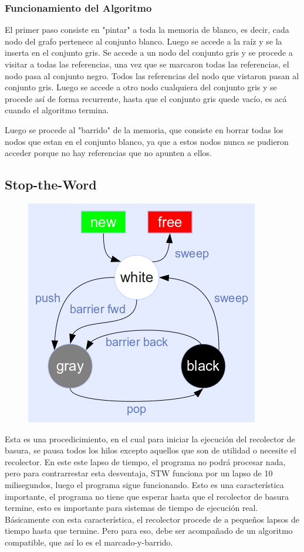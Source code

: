 \documentclass{article}
\begin{document}
\subsubsection{Funcionamiento del Algoritmo}

El primer paso consiste en "pintar" a toda la memoria de blanco, es decir, cada nodo del grafo pertenece al conjunto blanco. Luego se accede a la raíz y se la inserta en el conjunto gris. 
Se accede a un nodo del conjunto gris y se procede a visitar a todas las referencias, una vez que se marcaron todas las referencias, el nodo pasa al conjunto negro. Todos las referencias del nodo que vistaron pasan al conjunto gris. Luego se accede a otro nodo cualquiera del conjunto gris y se procede así de forma recurrente, hasta que el conjunto gris quede vacío, es acá cuando el algoritmo termina.

Luego se procede al "barrido" de la memoria, que consiste en borrar todas los nodos que estan en el conjunto blanco, ya que a estos nodos nunca se pudieron acceder porque no hay referencias que no apunten a ellos.


\subsection{Stop-the-Word}

\begin{figure}
\centering
\includegraphics[width=0.4\linewidth]{./gc_color3}
\label{fig:gc_color3}
\end{figure}


Esta es una procedicimiento, en el cual para iniciar la ejecución del recolector de basura, se pausa todos los hilos excepto aquellos que son de utilidad o necesite el recolector. En este este lapso de tiempo, el programa no podrá procesar nada, pero para contrarrestar esta desventaja, STW funciona por un lapso de 10 milisegundos, luego el programa sigue funcionando. Esto es una característica importante, el programa no tiene que esperar hasta que el recolector de basura termine, esto es importante para sistemas de tiempo de ejecución real. Básicamente con esta característica, el recolector procede de a pequeños lapsos de tiempo hasta que termine. Pero para eso, debe ser acompañado de un algoritmo compatible, que así lo es el marcado-y-barrido.
\end{document}
